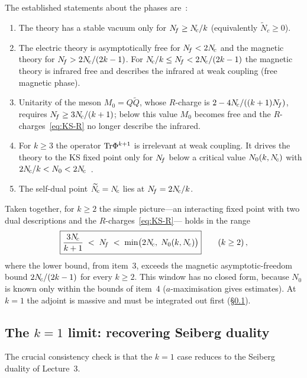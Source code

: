 \documentclass[11pt,a4paper]{article}
\newcommand{\Nctilde}{\widetilde{N}_{\!c}}
\begin{document}
The established statements about the phases are~\cite{KS9505004,KSS9510222}:
\begin{enumerate}
  \item The theory has a stable vacuum only for $N_{\!f} \geq N_{\!c}/k$
    (equivalently $\Nctilde \geq 0$).
  \item The electric theory is asymptotically free for $N_{\!f} < 2N_{\!c}$ and
    the magnetic theory for $N_{\!f} > 2N_{\!c}/(2k - 1)$.  For
    $N_{\!c}/k \leq N_{\!f} < 2N_{\!c}/(2k - 1)$ the magnetic theory is infrared
    free and describes the infrared at weak coupling (free magnetic
    phase).
  \item Unitarity of the meson $M_0 = Q\widetilde{Q}$, whose $R$-charge
    is $2 - 4N_{\!c}/((k+1)N_{\!f})$, requires $N_{\!f} \geq 3N_{\!c}/(k+1)$; below this
    value $M_0$ becomes free and the $R$-charges~\eqref{eq:KS-R} no
    longer describe the infrared.
  \item For $k \geq 3$ the operator $\mathrm{Tr}\Phi^{k+1}$ is irrelevant at weak
    coupling.  It drives the theory to the KS fixed point only for
    $N_{\!f}$ below a critical value $N_0(k, N_{\!c})$ with
    $2N_{\!c}/k < N_0 < 2N_{\!c}$~\cite{KS9505004}.
  \item The self-dual point $\Nctilde = \Nc$ lies at $N_{\!f} = 2N_{\!c}/k$.
\end{enumerate}
Taken together, for $k \geq 2$ the simple picture---an interacting fixed
point with two dual descriptions and the $R$-charges~\eqref{eq:KS-R}---%
holds in the range
\begin{equation}\label{eq:KS-window}
  \boxed{\frac{3N_{\!c}}{k+1} \;<\; N_{\!f} \;<\; \min\bigl(2N_{\!c},\; N_0(k, N_{\!c})\bigr)}
  \qquad (k \geq 2)\,,
\end{equation}
where the lower bound, from item~3, exceeds the magnetic
asymptotic-freedom bound $2N_{\!c}/(2k-1)$ for every $k \geq 2$.  This window
has no closed form, because $N_0$ is known only within the bounds of
item~4 ($a$-maximisation gives estimates).  At $k = 1$ the adjoint is
massive and must be integrated out first (\S\ref{ssec:KS-k1-limit}).

\subsection{The $k=1$ limit: recovering Seiberg duality}
\label{ssec:KS-k1-limit}

The crucial consistency check is that the $k=1$ case reduces to the
Seiberg duality of Lecture~3.
\end{document}
